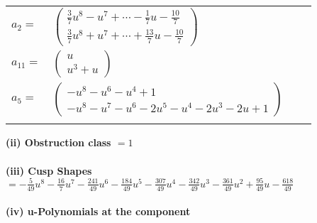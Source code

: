 \documentclass[1p]{elsarticle_modified}
\theoremstyle{definition}
\begin{document}
\begin{tabular}{m{7pt} m{180pt} m{7pt} m{180pt} }
\flushright $a_{2}=$&$\begin{pmatrix}\frac{3}{7} u^8- u^7+\cdots-\frac{1}{7} u-\frac{10}{7}\\\frac{3}{7} u^8+u^7+\cdots+\frac{13}{7} u-\frac{10}{7}\end{pmatrix}$ \\
\flushright $a_{11}=$&$\begin{pmatrix}u\\u^3+u\end{pmatrix}$ \\
\flushright $a_{5}=$&$\begin{pmatrix}- u^8- u^6- u^4+1\\- u^8- u^7- u^6-2 u^5- u^4-2 u^3-2 u+1\end{pmatrix}$\\&\end{tabular}
\flushleft \textbf{(ii) Obstruction class $= 1$}\\~\\
\flushleft \textbf{(iii) Cusp Shapes $= -\frac{5}{49} u^8-\frac{16}{7} u^7-\frac{241}{49} u^6-\frac{184}{49} u^5-\frac{307}{49} u^4-\frac{342}{49} u^3-\frac{361}{49} u^2+\frac{95}{49} u-\frac{618}{49}$}\\~\\
\newpage\renewcommand{\arraystretch}{1}
\flushleft \textbf{(iv) u-Polynomials at the component}\newline \\
\end{document}
